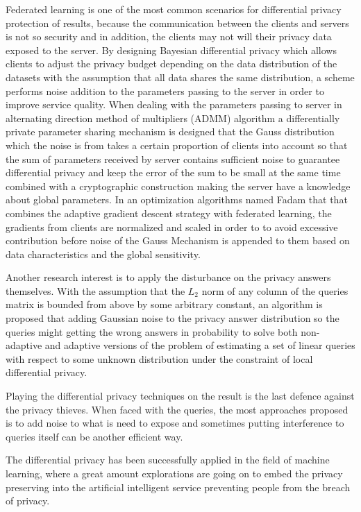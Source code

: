 \documentclass[conference]{IEEEtran}
\begin{document}
Federated learning is one of the most common scenarios for differential privacy protection of results, because the communication between the clients and servers is not so security and in addition, the clients may not will their privacy data exposed to the server. By designing Bayesian differential privacy which allows clients to adjust the privacy budget depending on the data distribution of the datasets with the assumption that all data shares the same distribution, a scheme\cite{b26} performs noise addition to the parameters passing to the server in order to improve service quality. When dealing with the parameters passing to server in alternating direction method of multipliers (ADMM) algorithm a differentially private parameter sharing mechanism\cite{b27} is designed that the Gauss distribution which the noise is from takes a certain proportion of clients into account so that the sum of parameters received by server contains sufficient noise to guarantee differential privacy and keep the error of the sum to be small at the same time combined with a cryptographic construction making the server have a knowledge about global parameters. In an optimization algorithms named Fadam\cite{b28} that that combines the adaptive gradient descent strategy with federated learning, the gradients from clients are normalized and scaled in order to to avoid excessive contribution before noise of the Gauss Mechanism is appended to them based on data characteristics and the global sensitivity. 

Another research interest is to apply the disturbance on the privacy answers themselves. With the assumption that the $L_2$ norm of any column of the queries matrix is bounded from above by some arbitrary constant, an algorithm\cite{b29}  is proposed that adding Gaussian noise to the privacy answer distribution so the queries might getting the wrong answers in probability to solve both non-adaptive and adaptive versions of the problem of estimating a set of linear queries with respect to some unknown distribution under the constraint of local differential privacy. 

Playing the differential privacy techniques on the result is the last defence against the privacy thieves. When faced with the queries, the most approaches proposed is to add noise to what is need to expose and sometimes putting interference to queries itself can be another efficient way.

The differential privacy has been successfully applied in the field of machine learning, where a great amount explorations are going on to embed the privacy preserving into the artificial intelligent service preventing people from the breach of privacy.
\end{document}
